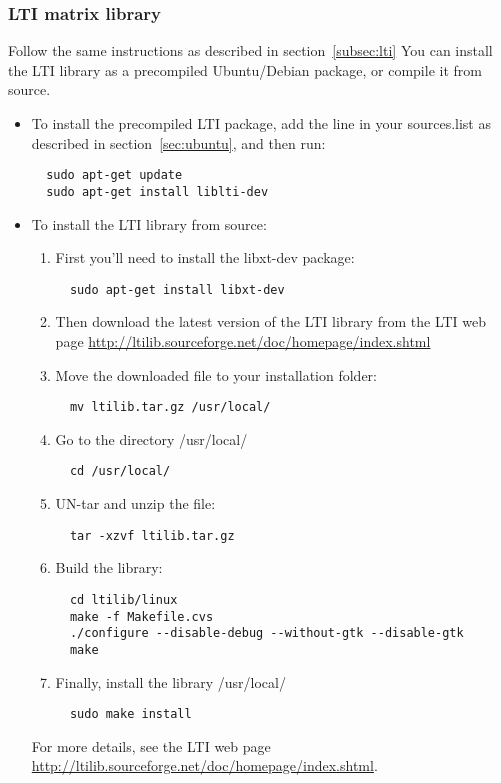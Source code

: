 \documentclass[a4paper,10pt]{article}
\begin{document}
\subsubsection{LTI matrix library}
Follow the same instructions as described in section~\ref{subsec:lti}
You can install the LTI library as a precompiled Ubuntu/Debian
package, or compile it from source. 
\begin{itemize}
\item To install the precompiled LTI package, add the line in your
  sources.list as described in section~\ref{sec:ubuntu}, and then run:
\begin{verbatim}
  sudo apt-get update
  sudo apt-get install liblti-dev
\end{verbatim}
\item To install the LTI library from source:

\begin{enumerate}
\item First you'll need to install the libxt-dev package:
\begin{verbatim}
  sudo apt-get install libxt-dev
\end{verbatim}
\item Then download the latest version of the LTI library from the LTI
  web page
  \url{http://ltilib.sourceforge.net/doc/homepage/index.shtml}
\item Move the downloaded file to your installation folder:
\begin{verbatim}
  mv ltilib.tar.gz /usr/local/
\end{verbatim}
\item Go to the directory /usr/local/
\begin{verbatim}
  cd /usr/local/
\end{verbatim}
\item UN-tar and unzip the file:
\begin{verbatim}
  tar -xzvf ltilib.tar.gz
\end{verbatim}
\item Build the library:
\begin{verbatim}
  cd ltilib/linux
  make -f Makefile.cvs
  ./configure --disable-debug --without-gtk --disable-gtk
  make
\end{verbatim}
\item Finally, install the library
/usr/local/
\begin{verbatim}
  sudo make install
\end{verbatim}
\end{enumerate}
For more details, see the LTI web page
\url{http://ltilib.sourceforge.net/doc/homepage/index.shtml}.
\end{itemize}
\end{document}

